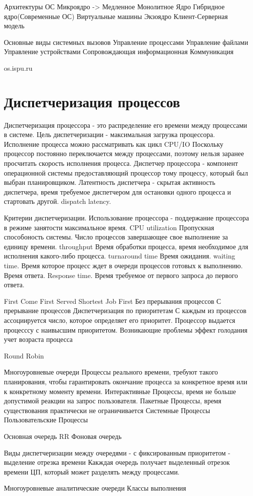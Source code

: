 \documentclass[a4paper]{article}
\begin{document}
Архитектуры ОС
Микроядро -> Медленное
Монолитное Ядро
Гибридное ядро(Современные ОС)
Виртуальные машины
Экзоядро
Клиент-Серверная модель

Основные виды системных вызовов
Управление процессами
Управление файлами
Управление устройствами
Сопровождающая информационная
Коммуникация

os.ispu.ru

\section{Диспетчеризация процессов}
Диспетчеризация процессора - это распределение его времени между процессами в системе.
Цель диспетчеризации - максимальная загрузка процессора. 
Исполнение процесса можно рассматривать как цикл CPU/IO
Поскольку процессор постоянно переключается между процессами, поэтому нельзя заранее просчитать скорость исполнения процесса.
Диспетчер процессора - компонент операционной системы предоставляющий процессор тому процессу, который был выбран планировщиком.
Латентность диспетчера - скрытая активность диспетчера, время требуемое диспетчером для остановки одного процесса и стартовать другой. dispatch latency.


Критерии диспетчеризации.
Использование процессора - поддержание процессора в режиме занятости максимальное время. CPU utilization
Пропускная способоность системы. Число процессов завершающее свое выполнение за единицу времени. throughput
Время обработки процесса, время необходимое для исполнения какого-либо процесса. turnaround time
Время ожидания. waiting time. Время которое процесс ждет в очереди процессов готовых к выполнению.
Время ответа. Response time. Время требуемое от первого запроса до первого ответа.

First Come First Served
Shortest Job First 
    Без прерывания процессов
    С прерывание процессов
Диспетчеризация по приоритетам
    С каждым из процессов ассоциируется число, которое определяет его приоритет. 
    Процессор выдается процесссу с наивысшим приоритетом.
    Возникающие проблемы
        эффект голодания
        учет возраста процесса
    
Round Robin

Многоуровневые очереди 
    Процессы реального времени, требуют такого планирования, чтобы гарантировать окончание процесса за конкретное время или к конкретному моменту времени. 
    Интерактивные Процессы, время не больше допустимой реакции на запрос пользователя.
    Пакетные Процессы, время существования практически не ограничивается
    \hline
    Системные Процессы
    Пользовательские Процессы

Основная очередь RR
Фоновая очередь

Виды диспетчеризации между очередями
- с фиксированным приоритетом
- выделение отрезка времени
Какждая очередь получает выделенный отрезок времени ЦП, который может разделять между процессами.


Многоуровневые аналитические очереди
    Классы выполнения
    
\end{document}
